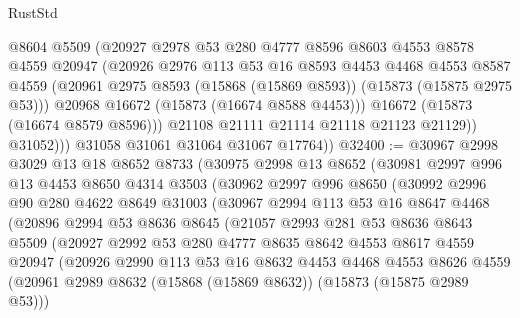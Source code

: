 \begin{lexlean}{RustStd}
\begin{coremodule}
                  @8604
                  @5509
                  (@20927
                    @2978
                    @53
                    @280
                    @4777
                    @8596
                    @8603
                    @4553
                    @8578
                    @4559
                    @20947
                    (@20926
                      @2976
                      @113
                      @53
                      @16
                      @8593
                      @4453
                      @4468
                      @4553
                      @8587
                      @4559
                      (@20961 @2975 @8593 (@15868 (@15869 @8593)) (@15873 (@15875 @2975 @53)))
                      @20968
                      @16672
                      (@15873 (@16674 @8588 @4453)))
                    @16672
                    (@15873 (@16674 @8579 @8596)))
                  @21108
                  @21111
                  @21114
                  @21118
                  @21123
                  @21129))
              @31052)))
        @31058
        @31061
        @31064
        @31067
        @17764))
@32400 := @30967
    @2998
    @3029
    @13
    @18
    @8652
    @8733
    (@30975
      @2998
      @13
      @8652
      (@30981
        @2997
        @996
        @13
        @4453
        @8650
        @4314
        @3503
        (@30962
          @2997
          @996
          @8650
          (@30992
            @2996
            @90
            @280
            @4622
            @8649
            @31003
            (@30967
              @2994
              @113
              @53
              @16
              @8647
              @4468
              (@20896
                @2994
                @53
                @8636
                @8645
                (@21057
                  @2993
                  @281
                  @53
                  @8636
                  @8643
                  @5509
                  (@20927
                    @2992
                    @53
                    @280
                    @4777
                    @8635
                    @8642
                    @4553
                    @8617
                    @4559
                    @20947
                    (@20926
                      @2990
                      @113
                      @53
                      @16
                      @8632
                      @4453
                      @4468
                      @4553
                      @8626
                      @4559
                      (@20961 @2989 @8632 (@15868 (@15869 @8632)) (@15873 (@15875 @2989 @53)))

\end{coremodule}
\end{lexlean}
